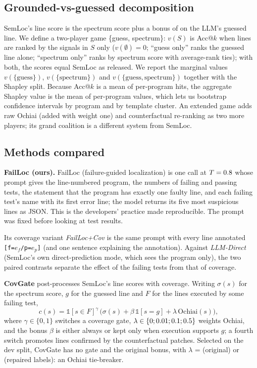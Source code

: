 \subsection{Grounded-vs-guessed decomposition}
SemLoc's line score is the spectrum score plus a bonus of \ConstPriorWeight{} on the LLM's guessed line. We define a
two-player game \{guess, spectrum\}: $v(S)$ is Acc@$k$ when lines are ranked by the signals in $S$ only ($v(\emptyset)=0$;
``guess only'' ranks the guessed line alone; ``spectrum only'' ranks by spectrum score with average-rank ties); with both,
the scores equal SemLoc as released. We report the marginal values $v(\{\text{guess}\})$, $v(\{\text{spectrum}\})$ and
$v(\{\text{guess},\text{spectrum}\})$ together with the Shapley split. Because Acc@$k$ is a mean of per-program hits, the
aggregate Shapley value is the mean of per-program values, which lets us bootstrap confidence intervals by program and by
template cluster. An extended game adds raw Ochiai (added with weight one) and counterfactual re-ranking as two more
players; its grand coalition is a different system from SemLoc.

\subsection{Methods compared}
\textbf{FailLoc (ours).} FailLoc (failure-guided localization) is one call at $T=0.8$ whose prompt gives the line-numbered program, the
numbers of failing and passing tests, the statement that the program has exactly one faulty line, and each failing
test's name with its first error line; the model returns its five most suspicious lines as JSON. This is the developers'
practice made reproducible. The prompt was fixed before looking at test results.

Its coverage variant \emph{FailLoc+Cov} is the same prompt with every line annotated
\texttt{[f=$e_f$/p=$e_p$]} (and one sentence explaining the annotation). Against \emph{LLM-Direct} (SemLoc's own
direct-prediction mode, which sees the program only), the two paired contrasts separate the effect of the failing tests
from that of coverage.

\textbf{CovGate} post-processes SemLoc's line scores with coverage. Writing $\sigma(s)$ for the spectrum score, $g$ for
the guessed line and $F$ for the lines executed by some failing test,
\begin{equation}
c(s) = \mathbb{1}[s\in F]^{\gamma}\,\bigl(\sigma(s) + \beta\,\mathbb{1}[s=g] + \lambda\,\mathrm{Ochiai}(s)\bigr),
\label{eq:covgate}
\end{equation}
where $\gamma\in\{0, 1\}$ switches a coverage gate, $\lambda\in\{0; 0.01; 0.1; 0.5\}$ weights Ochiai, and the bonus $\beta$
is either always \ConstPriorWeight{} or kept only when execution supports $g$; a fourth switch promotes lines confirmed by
the counterfactual patches. Selected on the dev split, CovGate has no gate and the original bonus, with $\lambda$ =
\ConstLambdaOriginal{} (original) or \ConstLambdaRepaired{} (repaired labels): an Ochiai tie-breaker.

